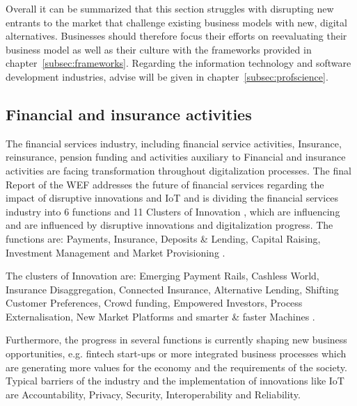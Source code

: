 Overall it can be summarized that this section struggles with disrupting new entrants to the market that challenge existing business models with new, digital alternatives. Businesses should therefore focus their efforts on reevaluating their business model as well as their culture with the frameworks provided in chapter~\ref{subsec:frameworks}. Regarding the information technology and software development industries, advise will be given in chapter~\ref{subsec:profscience}. 

\subsection{Financial and insurance activities}

The financial services industry, including financial service activities, Insurance, reinsurance, pension funding and activities auxiliary to Financial and insurance activities \citeauthor{ISIC:2008} are facing transformation throughout digitalization processes. The final Report of the \ac{WEF} addresses the future of financial services regarding the impact of disruptive innovations and \ac{IoT} \cite{WEF-futureFinancialServices} and is dividing the financial services industry into 6 functions and 11 Clusters of Innovation \cite{WEF-futureFinancialServices}, which are influencing and are influenced by disruptive innovations and digitalization progress.
The functions are:
Payments, Insurance, Deposits \& Lending, Capital Raising, Investment Management and Market Provisioning \cite{WEF-futureFinancialServices}.

The clusters of Innovation are:
Emerging Payment Rails, Cashless World, Insurance Disaggregation, Connected Insurance, Alternative Lending, Shifting Customer Preferences, Crowd funding, Empowered Investors, Process Externalisation, New Market Platforms and smarter \& faster Machines \cite{WEF-futureFinancialServices}.

Furthermore, the progress in several functions is currently shaping new business opportunities, e.g. fintech start-ups or more integrated business processes which are generating more values for the economy and the requirements of the society.
Typical barriers of the industry and the implementation of innovations like \ac{IoT} are Accountability, Privacy, Security, Interoperability and Reliability. \cite{WEF-futureFinancialServices, Weber2011133, CapGemini-IoT-financialServices} %


